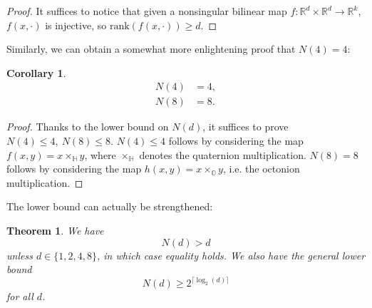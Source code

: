 \documentclass[11pt, a4paper, reqno]{elsarticle}
\newtheorem{theorem}{Theorem}[section]
\newtheorem{corollary}{Corollary}[theorem]
\theoremstyle{definition}
\theoremstyle{remark}
\begin{document}
\begin{proof} It suffices to notice that
given a nonsingular bilinear map
$f\colon\mathbb{R}^d\times \mathbb{R}^d\to \mathbb{R}^k$, $f(x,\cdot)$ is injective, so
$\mathrm{rank}(f(x,\cdot))\ge d$.
\end{proof}
Similarly, we can obtain a somewhat more enlightening proof
that $N(4)=4$:
\begin{corollary}
\begin{align*}
	N(4)
&=
	4,\\
	N(8)
&=
	8.
\end{align*}
\end{corollary}
\begin{proof}
Thanks to the lower bound on $N(d)$, it suffices to prove
$N(4)\le 4,\ N(8)\le 8$.
$N(4)\le 4$ follows by considering the map  $f(x,y)=x\times_{\mathbb H} y$,
where $\times_{\mathbb H}$ denotes the quaternion multiplication.
$N(8)=8$ follows by considering the map $h(x,y)=
x\times_{\mathbb O} y$, i.e. the octonion multiplication.
\end{proof}
The lower bound can actually be strengthened:
\begin{theorem}\label{thm : lowerbound2}
We have
\begin{equation}
	N(d)
>
	 d
\end{equation}
unless $d\in \{1,2,4,8\}$, in which case equality holds.
We also have the general lower bound
\begin{equation*}
	N(d)
\ge
	2^{\lceil \log_2(d)\rceil}
\end{equation*}
for all $d$.
\end{theorem}
\end{document}
